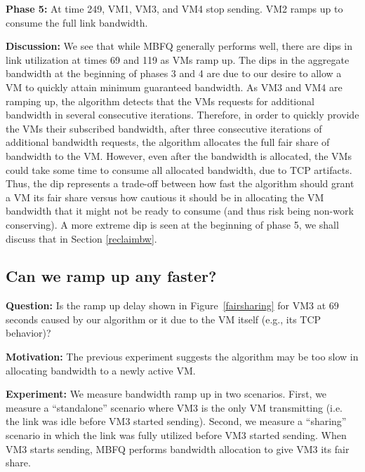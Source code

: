 {\bf Phase 5:} At time 249, VM1, VM3, and VM4 stop sending. VM2
ramps up to consume the full link bandwidth.

{\bf Discussion:} We see that while MBFQ generally performs well, there are dips
in link utilization at times 69 and 119 as VMs ramp up. The dips in the aggregate
bandwidth at the beginning of phases 3
and 4 are due to our desire to allow a VM to quickly attain minimum
guaranteed bandwidth. As VM3 and VM4 are ramping up, the algorithm detects that
the VMs requests for additional bandwidth in several consecutive iterations.
Therefore, in order to quickly provide the VMs their subscribed bandwidth, after
three consecutive iterations of additional bandwidth requests, the algorithm
allocates the full fair share of bandwidth to the VM. However, even after
    the bandwidth is allocated, the VMs could take some time to consume all allocated
bandwidth, due to
TCP artifacts. Thus, the dip represents a trade-off between how fast the
algorithm should grant a VM its fair share versus how cautious it should be in
allocating the VM bandwidth that it might not be ready to consume (and thus risk
being non-work conserving). A more extreme dip is seen at the
beginning of phase 5, we shall discuss that in Section \ref{reclaimbw}.

\subsection{Can we ramp up any faster?}

{\bf Question:}  Is the ramp up delay shown in Figure~\ref{fairsharing} for VM3
at 69 seconds caused by our algorithm or it due to the VM itself (e.g., its TCP
behavior)?

{\bf Motivation:} The previous experiment suggests the algorithm may be too slow
in allocating bandwidth to a newly active VM.  

{\bf Experiment:} We measure bandwidth ramp up in two scenarios.  First, we
measure a  ``standalone'' scenario where VM3 is the only VM transmitting (i.e. the link
was idle before VM3 started sending).  Second, we measure a  ``sharing'' scenario
in which the link was fully utilized before VM3 started sending. When VM3 starts
sending, MBFQ performs bandwidth allocation to give VM3 its fair share.

